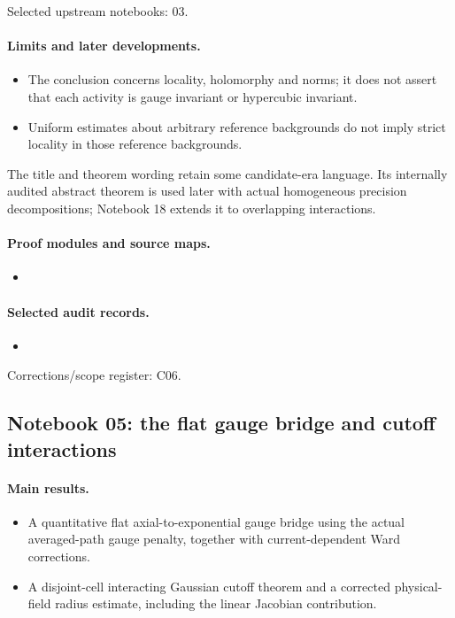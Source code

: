 Selected upstream notebooks: 03.\par

\paragraph{Limits and later developments.}
\begin{itemize}
\item The conclusion concerns locality, holomorphy and norms; it does not assert that each activity is gauge invariant or hypercubic invariant.
\item Uniform estimates about arbitrary reference backgrounds do not imply strict locality in those reference backgrounds.
\end{itemize}

The title and theorem wording retain some candidate-era language. Its internally audited abstract theorem is used later with actual homogeneous precision decompositions; Notebook 18 extends it to overlapping interactions.

\paragraph{Proof modules and source maps.}
\begingroup\small
\begin{itemize}
\item {}
\end{itemize}
\endgroup

\paragraph{Selected audit records.}
\begingroup\small
\begin{itemize}
\item {}
\end{itemize}
\endgroup
Corrections/scope register: C06.\par

\subsection{Notebook 05: the flat gauge bridge and cutoff interactions}
\label{hnc-05}
\noindent{}\par

\paragraph{Main results.}
\begin{itemize}
\item A quantitative flat axial-to-exponential gauge bridge using the actual averaged-path gauge penalty, together with current-dependent Ward corrections.
\item A disjoint-cell interacting Gaussian cutoff theorem and a corrected physical-field radius estimate, including the linear Jacobian contribution.
\end{itemize}

